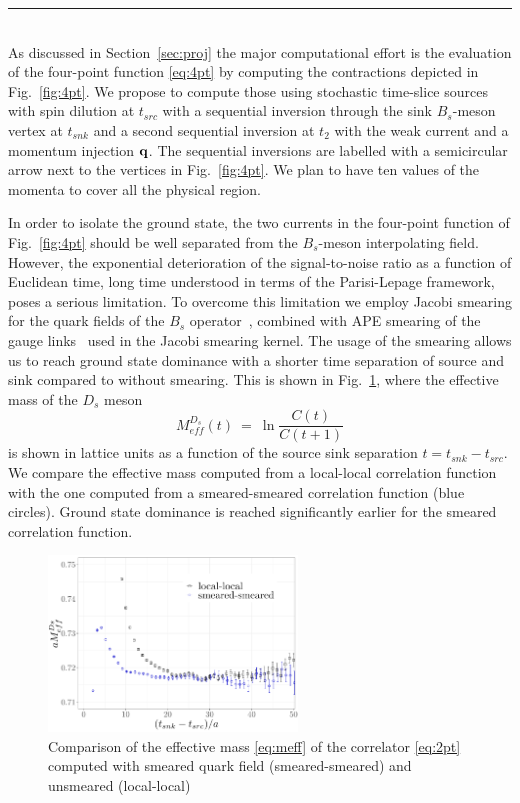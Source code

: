 \label{sec:algos}
\rule{\textwidth}{0.4pt}\\

As discussed in Section~\ref{sec:proj} the major computational effort is 
the evaluation of the four-point function \eqref{eq:4pt} by computing the
contractions depicted in Fig.~\ref{fig:4pt}.
We propose to compute those using stochastic time-slice sources with
spin dilution at $t_{src}$ with a sequential inversion through the
sink $B_s$-meson vertex at $t_{snk}$ and a second sequential inversion
at $t_2$ with the weak current and a momentum injection ${\bf q}$.
The sequential inversions are labelled with a semicircular arrow next to
the vertices in Fig.~\ref{fig:4pt}. We plan to have ten values of the
momenta to cover all the physical region.

In order to isolate the ground state, the two currents in the
four-point function of Fig.~\ref{fig:4pt} should be well separated
from the $B_s$-meson interpolating field. However, the exponential
deterioration of the signal-to-noise ratio as a function of Euclidean
time, long time understood in terms of the Parisi-Lepage framework,
poses a serious limitation. To overcome this limitation we employ
Jacobi smearing for the quark fields of the $B_s$
operator~\cite{Allton:1993wc}, combined with APE smearing of the gauge
links~\cite{FALCIONI1985624} used in the Jacobi smearing kernel.  
The usage of the smearing allows us to reach ground state dominance 
with a shorter time separation of source and sink compared to without
smearing. This is shown in Fig.~\ref{fig:smearing}, where the
effective mass of the $D_s$ meson
\begin{equation}\label{eq:meff}
	M_{eff}^{D_s}(t)\ =\ \ln\frac{C(t)}{C(t+1)}	
\end{equation}
is shown in lattice units as a function of the source sink separation $t=t_{snk}-t_{src}$. We compare the effective mass
computed from a local-local correlation function with the one computed from
a smeared-smeared correlation function (blue circles). Ground state
dominance is reached significantly earlier for the smeared correlation
function. 
             
\begin{figure}
  \includegraphics[width=0.59\textwidth]{plots/smearing_MDs.pdf}
  \caption{Comparison of the effective mass \eqref{eq:meff} of the correlator
    \eqref{eq:2pt}  computed with
    smeared quark field (smeared-smeared) and unsmeared (local-local)} 
  \label{fig:smearing}
\end{figure}

